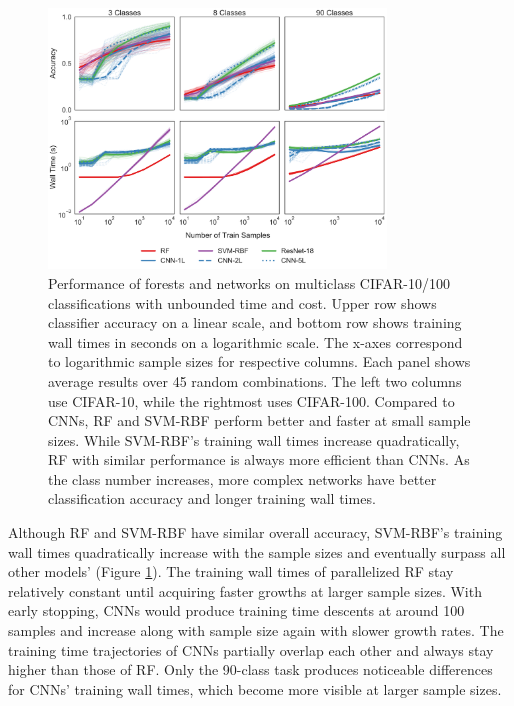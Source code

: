 \begin{figure}[htb]
\centering
\includegraphics[width=0.8\textwidth]{figures/cifar}
  \caption{Performance of forests and networks on multiclass CIFAR-10/100 classifications with unbounded time and cost.
  Upper row shows classifier accuracy on a linear scale, and bottom row shows training wall times in seconds on a logarithmic scale. The x-axes correspond to logarithmic sample sizes for respective columns. Each panel shows average results over 45 random combinations. The left two columns use CIFAR-10, while the rightmost uses CIFAR-100.
  Compared to CNNs, RF and SVM-RBF perform better and faster at small sample sizes. While SVM-RBF's training wall times increase quadratically, RF with similar performance is always more efficient than CNNs. As the class number increases, more complex networks have better classification accuracy and longer training wall times.
  }
\label{fig:cifar}
\end{figure}

Although RF and SVM-RBF have similar overall accuracy, SVM-RBF's training wall times quadratically increase with the sample sizes and eventually surpass all other models' (Figure \ref{fig:cifar}). The training wall times of parallelized RF stay relatively constant until acquiring faster growths at larger sample sizes. With early stopping, CNNs would produce training time descents at around 100 samples and increase along with sample size again with slower growth rates. The training time trajectories of CNNs partially overlap each other and always stay higher than those of RF. Only the 90-class task produces noticeable differences for CNNs' training wall times, which become more visible at larger sample sizes.


